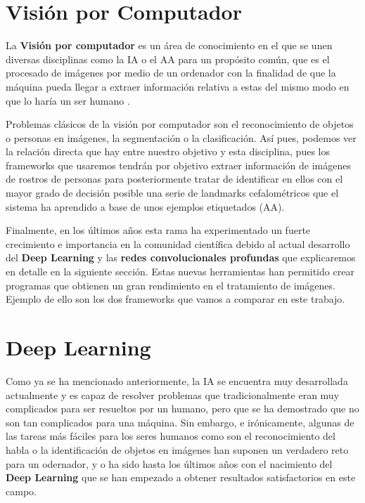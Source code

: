 \section{Visión por Computador}
    \noindent La \textbf{Visión por computador} es un área de conocimiento en el que se unen diversas disciplinas como la IA o el AA para un propósito común, que es el procesado de imágenes por medio de un ordenador con la finalidad de que la máquina pueda llegar a extraer información relativa a estas del mismo modo en que lo haría un ser humano \cite{rosenfeld1988computer}. 

    \medskip
    
    \noindent Problemas clásicos de la visión por computador son el reconocimiento de objetos o personas en imágenes, la segmentación o la clasificación. Así pues, podemos ver la relación directa que hay entre nuestro objetivo y esta disciplina, pues los frameworks que usaremos tendrán por objetivo extraer información de imágenes de rostros de personas para posteriormente tratar de identificar en ellos con el mayor grado de decisión posible una serie de landmarks cefalométricos que el sistema ha aprendido a base de unos ejemplos etiquetados (AA).

    \medskip

    \noindent Finalmente, en los últimos años esta rama ha experimentado un fuerte crecimiento e importancia en la comunidad científica debido al actual desarrollo del \textbf{Deep Learning} y las \textbf{redes convolucionales profundas} que explicaremos en detalle en la siguiente sección. Estas nuevas herramientas han permitido crear programas que obtienen un gran rendimiento en el tratamiento de imágenes. Ejemplo de ello son los dos frameworks que vamos a comparar en este trabajo.

\section{Deep Learning}
    Como ya se ha mencionado anteriormente, la IA se encuentra muy desarrollada actualmente y es capaz de resolver problemas que tradicionalmente eran muy complicados para ser resueltos por un humano, pero que se ha demostrado que no son tan complicados para una máquina. Sin embargo, e irónicamente, algunas de las tareas más fáciles para los seres humanos como son el reconocimiento del habla o la identificación de objetos en imágenes han suponen un verdadero reto para un odernador, y o ha sido hasta los últimos años con el nacimiento del \textbf{Deep Learning} que se han empezado a obtener resultados satisfactorios en este campo.
    
